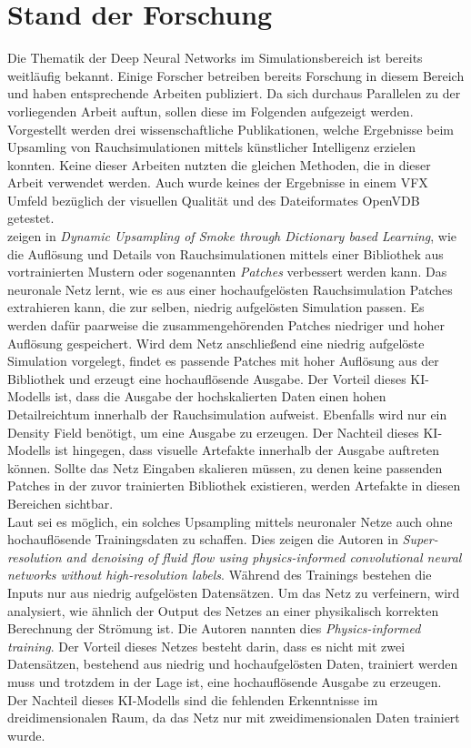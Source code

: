 \chapter{Stand der Forschung}
\thispagestyle{fancy}

Die Thematik der Deep Neural Networks im Simulationsbereich ist bereits weitläufig bekannt. Einige Forscher betreiben bereits Forschung in diesem Bereich und haben entsprechende Arbeiten publiziert. Da sich durchaus Parallelen zu der vorliegenden Arbeit auftun, sollen diese im Folgenden aufgezeigt werden. Vorgestellt werden drei wissenschaftliche Publikationen, welche Ergebnisse beim Upsamling von Rauchsimulationen mittels künstlicher Intelligenz erzielen konnten. Keine dieser Arbeiten nutzten die gleichen Methoden, die in dieser Arbeit verwendet werden. Auch wurde keines der Ergebnisse in einem VFX Umfeld bezüglich der visuellen Qualität und des Dateiformates OpenVDB getestet.\\

\citet[]{baidirectory} zeigen in \textit{Dynamic Upsampling of Smoke through Dictionary based Learning}, wie die Auflösung und Details von Rauchsimulationen mittels einer Bibliothek aus vortrainierten Mustern oder sogenannten \textit{Patches} verbessert werden kann. Das neuronale Netz lernt, wie es aus einer hochaufgelösten Rauchsimulation Patches extrahieren kann, die zur selben, niedrig aufgelösten Simulation passen. Es werden dafür paarweise die zusammengehörenden Patches niedriger und hoher Auflösung gespeichert. Wird dem Netz anschließend eine niedrig aufgelöste Simulation vorgelegt, findet es passende Patches mit hoher Auflösung aus der Bibliothek und erzeugt eine hochauflösende Ausgabe. Der Vorteil dieses KI-Modells ist, dass die Ausgabe der hochskalierten Daten einen hohen Detailreichtum innerhalb der Rauchsimulation aufweist. Ebenfalls wird nur ein Density Field benötigt, um eine Ausgabe zu erzeugen. Der Nachteil dieses KI-Modells ist hingegen, dass visuelle Artefakte innerhalb der Ausgabe auftreten können. Sollte das Netz Eingaben skalieren müssen, zu denen keine passenden Patches in der zuvor trainierten Bibliothek existieren, werden Artefakte in diesen Bereichen sichtbar.\\

Laut \citet[]{Gao_2021} sei es möglich, ein solches Upsampling mittels neuronaler Netze auch ohne hochauflösende Trainingsdaten zu schaffen. Dies zeigen die Autoren in \textit{Super-resolution and denoising of fluid flow using physics-informed convolutional neural networks without high-resolution labels}. Während des Trainings bestehen die Inputs nur aus niedrig aufgelösten Datensätzen. Um das Netz zu verfeinern, wird analysiert, wie ähnlich der Output des Netzes an einer physikalisch korrekten Berechnung der Strömung ist. Die Autoren nannten dies \textit{Physics-informed training}. Der Vorteil dieses Netzes besteht darin, dass es nicht mit zwei Datensätzen, bestehend aus niedrig und hochaufgelösten Daten, trainiert werden muss und trotzdem in der Lage ist, eine hochauflösende Ausgabe zu erzeugen. Der Nachteil dieses KI-Modells sind die fehlenden Erkenntnisse im dreidimensionalen Raum, da das Netz nur mit zweidimensionalen Daten trainiert wurde. \\

